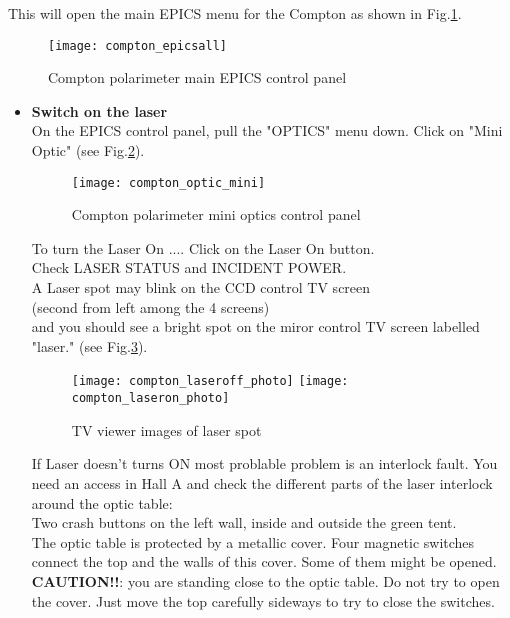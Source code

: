 {This will open the main EPICS menu for the Compton as shown in Fig.\ref{fig:compton_epicsall}.
 \begin{figure}[htp]
    \begin{center}
        \texttt{[image: compton\_epicsall]}
    \end{center}
    \caption[compton:epics main control]{Compton polarimeter main EPICS control panel }
    \label{fig:compton_epicsall}
 \end{figure}


\begin{itemize}
\item {\bf Switch on the laser}\\

On the EPICS control panel, pull the "OPTICS" menu down. Click on "Mini Optic" 
(see Fig.\ref{fig:compton_optic_mini}).
\begin{figure}[htp]
    \begin{center}
        \texttt{[image: compton\_optic\_mini]}
     \end{center}
    \caption[compton:epics mini control]{Compton polarimeter mini optics control panel }
    \label{fig:compton_optic_mini}
 \end{figure}


To turn the Laser On .... Click on the Laser On button.\\
        Check LASER STATUS and INCIDENT POWER.\\
        A Laser spot may blink on the CCD control TV screen\\ 
	(second from left among the 4 screens)\\
        and you should see a bright spot on the miror control TV screen labelled "laser." 
	(see Fig.\ref{fig:compton_laser_photo}).
 \begin{figure}[htp]
    \begin{center}
        \texttt{[image: compton\_laseroff\_photo]}
        \texttt{[image: compton\_laseron\_photo]}
    \end{center}
    \caption[compton:laser spot]{TV viewer images of laser spot }
    \label{fig:compton_laser_photo}
 \end{figure}

        If Laser doesn't turns ON most problable problem is an interlock
        fault.
        You need an access in Hall A and check the different parts of the
        laser interlock around the optic table:\\
        Two crash buttons on the left wall, inside and outside the green
        tent.\\
        The optic table is protected by a metallic cover. Four magnetic switches connect the top and the walls
        of this cover. Some of them might be opened. {\bf CAUTION!!}: you are standing close to the optic table.
        Do not try to open the cover. Just move the top carefully sideways to try to close the switches.
	

\end{itemize}}
